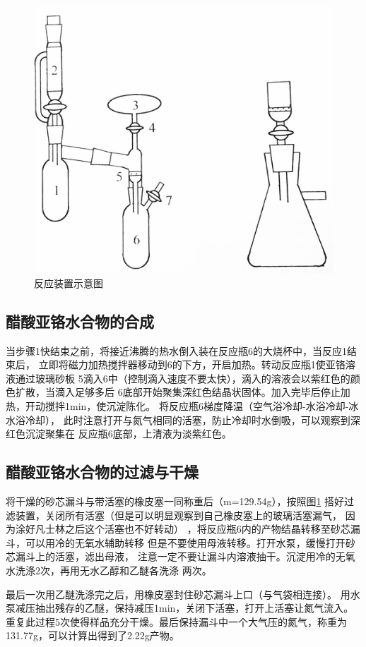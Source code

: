 \documentclass[a4paper,zihao=5,UTF8]{ctexart}
\begin{document}
        \begin{figure}
            \centering
            \includegraphics[scale=0.13]{zhuangzhi.jpg}
            \caption{反应装置示意图}
            \label{zhuangzhi}
        \end{figure}
        \subsection{醋酸亚铬水合物的合成}
        当步骤1快结束之前，将接近沸腾的热水倒入装在反应瓶6的大烧杯中，当反应1结束后，
        立即将磁力加热搅拌器移动到6的下方，开启加热。转动反应瓶1使亚铬溶液通过玻璃砂板
        5滴入6中（控制滴入速度不要太快），滴入的溶液会以紫红色的颜色扩散，当滴入足够多后
        6底部开始聚集深红色结晶状固体。加入完毕后停止加热，开动搅拌1min，使沉淀陈化。
        将反应瓶6梯度降温（空气浴冷却-水浴冷却-冰水浴冷却），
        此时注意打开与氮气相同的活塞，防止冷却时水倒吸，可以观察到深红色沉淀聚集在
        反应瓶6底部，上清液为淡紫红色。
        \subsection{醋酸亚铬水合物的过滤与干燥}
        将干燥的砂芯漏斗与带活塞的橡皮塞一同称重后（m=129.54g），按照图\ref{zhuangzhi}
        搭好过滤装置，关闭所有活塞（但是可以明显观察到自己橡皮塞上的玻璃活塞漏气，
        因为涂好凡士林之后这个活塞也不好转动）
        ，将反应瓶6内的产物结晶转移至砂芯漏斗，可以用冷的无氧水辅助转移
        但是不要使用母液转移。打开水泵，缓慢打开砂芯漏斗上的活塞，滤出母液，
        注意一定不要让漏斗内溶液抽干。沉淀用冷的无氧水洗涤2次，再用无水乙醇和乙醚各洗涤
        两次。
        \par 
        最后一次用乙醚洗涤完之后，用橡皮塞封住砂芯漏斗上口（与气袋相连接）。
        用水泵减压抽出残存的乙醚，保持减压1min，关闭下活塞，打开上活塞让氮气流入。
        重复此过程5次使得样品充分干燥。最后保持漏斗中一个大气压的氮气，称重为
        131.77g，可以计算出得到了2.22g产物。
\end{document}
